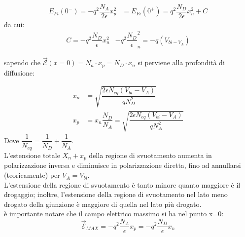 \begin{align}
    E_{Fi}(0^-)=-q^2\dfrac{N_A}{2\epsilon}x_p^2 &=E_{Fi}(0^+)=q^2\dfrac{N_D}{2\epsilon}x_n^2 + C
\end{align}
da cui:
\begin{align}
    C= -q^2\dfrac{N_D}{\epsilon}x_n^2 &- q^2\dfrac{N_D}{\epsilon}_n^2 = -q(V_{bi-V_A})
\end{align}

sapendo che $\mathcal{\vec{E}}(x=0)=N_a \cdot x_p = N_D \cdot x_n$ si perviene alla profondità di diffusione:

\begin{align}
    x_n&= \sqrt{\dfrac{2\epsilon N_{eq}(V_{bi}-V_A)}{qN_D^2}}\\
    x_p&= x_n\dfrac{N_D}{N_A}= \sqrt{\dfrac{2\epsilon N_{eq}(V_{bi}-V_A)}{qN_A^2}}
\end{align}
Dove $\dfrac{1}{N_{eq}}= \dfrac{1}{N_D} + \dfrac{1}{N_A}$.\\

L'estensione totale $X_n + x_p$ della regione di svuotamento aumenta in polarizzazione inversa e diminuisce in polarizzazione diretta, fino ad annullarsi (teoricamente) per $V_A=V_{bi}$.\\
L'estensione della regione di svuotamento è tanto minore quanto maggiore è il drogaggio;
inoltre, l'estensione della regione di svuotamento nel lato meno drogato della giunzione è maggiore di quella nel lato più drogato.\\

è importante notare che il campo elettrico massimo si ha nel punto x=0:
\begin{equation}
    \mathcal{\vec{E}}_{MAX}=-q^2\dfrac{N_A}{\epsilon}x_p=-q^2\dfrac{N_D}{\epsilon}x_n
\end{equation}
